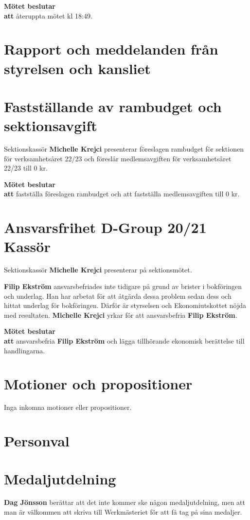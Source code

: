 \documentclass{datateknologsektionen-document}
\newcommand{\ind}{\hspace*{2em}}
\newcommand{\motetbeslutar}{\textbf{Mötet beslutar}}
\newcommand{\att}{\\\ind\textbf{att}}
\begin{document}
\motetbeslutar\att{} återuppta mötet kl 18:49.
\section{Rapport och meddelanden från styrelsen och kansliet}



\section{Fastställande av rambudget och sektionsavgift}
Sektionskassör \textbf{Michelle Krejci} presenterar föreslagen rambudget för sektionen för verksamhetsåret 22/23 och föreslår medlemsavgiften för verksamhetsåret 22/23 till 0 kr. 

\motetbeslutar\att{} fastställa föreslagen rambudget och att fastställa medlemsavgiften till 0 kr. 




\pagebreak
\section{Ansvarsfrihet D-Group 20/21 Kassör}
Sektionskassör \textbf{Michelle Krejci} presenterar på sektionsmötet.

\textbf{Filip Ekström} ansvarsbefriades inte tidigare på grund av brister i bokföringen och underlag. Han har arbetat för att åtgärda dessa problem sedan dess och hittat underlag för bokföringen. Därför är styrselsen och Ekonomiutskottet nöjda med resultaten. \textbf{Michelle Krejci} yrkar för att ansvarsbefria \textbf{Filip Ekström}.

\motetbeslutar\att{} ansvarsbefria \textbf{Filip Ekström} och lägga tillhörande ekonomisk berättelse till handlingarna.

\section{Motioner och propositioner}
Inga inkomna motioner eller propositioner. 

\section{Personval}



\pagebreak
\section{Medaljutdelning}
\textbf{Dag Jönsson} berättar att det inte kommer ske någon medaljutdelning, men att man är välkommen att skriva till Werkmästeriet för att få tag på sina medaljer.
\end{document}
